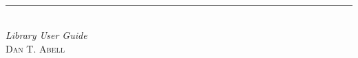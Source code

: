 
\cleardoublepage
\thispagestyle{empty}
{\raggedright
\fontsize{96}{108}\selectfont
\vspace*{0.20\textheight}\vspace*{-1.07\baselineskip}
{\color{DarkRed}}\\[-0.85\baselineskip]
\rule{\textwidth}{4\normalrulethickness}\\[9pt]
\Huge\textit{Library User Guide}\\
{\huge\vspace*{5em}\textsc{Dan T. Abell}}\\
\vfill
\vspace*{0.1\textheight}
}


\blankpage
\thispagestyle{empty}


\endinput
